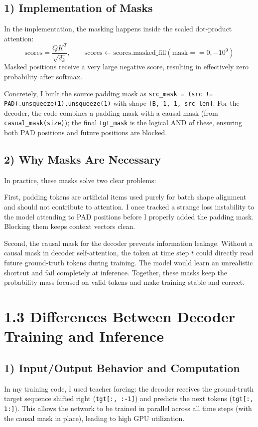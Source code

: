 \documentclass[11pt]{article}
\begin{document}
\subsection*{1) Implementation of Masks}
In the implementation, the masking happens inside the scaled dot-product attention:
\[
\text{scores} = \frac{QK^{T}}{\sqrt{d_k}},\qquad
\text{scores} \leftarrow \text{scores.masked\_fill}(\text{mask}==0, -10^9)
\]
Masked positions receive a very large negative score, resulting in effectively zero probability after softmax. 

Concretely, I built the source padding mask as \texttt{src\_mask = (src != PAD).unsqueeze(1).unsqueeze(1)} with shape \texttt{[B, 1, 1, src\_len]}. For the decoder, the code combines a padding mask with a causal mask (from \texttt{casual\_mask(size)}); the final \texttt{tgt\_mask} is the logical AND of these, ensuring both PAD positions and future positions are blocked.

\subsection*{2) Why Masks Are Necessary}
In practice, these masks solve two clear problems:

First, padding tokens are artificial items used purely for batch shape alignment and should not contribute to attention. I once tracked a strange loss instability to the model attending to PAD positions before I properly added the padding mask. Blocking them keeps context vectors clean.

Second, the causal mask for the decoder prevents information leakage. Without a causal mask in decoder self-attention, the token at time step $t$ could directly read future ground-truth tokens during training. The model would learn an unrealistic shortcut and fail completely at inference. Together, these masks keep the probability mass focused on valid tokens and make training stable and correct.


\section*{1.3 Differences Between Decoder Training and Inference}

\subsection*{1) Input/Output Behavior and Computation}
In my training code, I used teacher forcing: the decoder receives the ground-truth target sequence shifted right (\texttt{tgt[:, :-1]}) and predicts the next tokens (\texttt{tgt[:, 1:]}). This allows the network to be trained in parallel across all time steps (with the causal mask in place), leading to high GPU utilization. 
\end{document}
